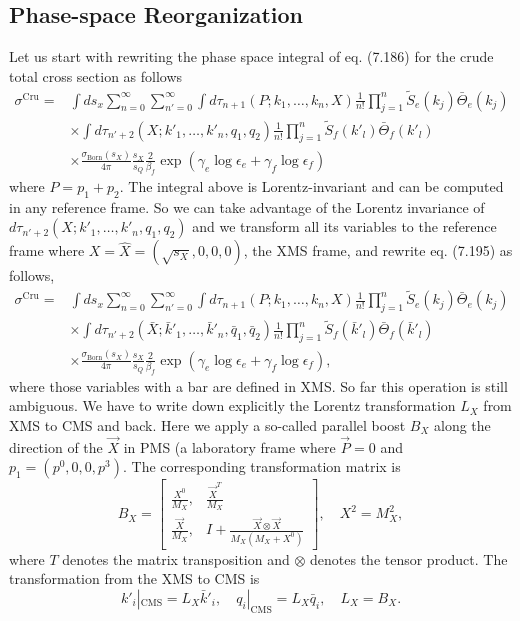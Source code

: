 \subsection{Phase-space Reorganization}
Let us start with rewriting the phase space integral of eq. (7.186) for the crude total cross section as follows 
\begin{align}
\sigma^\text{Cru}=&\int ds_x\sum_{n=0}^{\infty}\sum_{n'=0}^{\infty}\int d\tau_{n+1}(P;k_1,\ldots,k_n,X)
 \frac{1}{n!}\prod_{j=1}^{n}\widetilde{S}_e(k_j)\bar{\Theta}_e(k_j)\nonumber\\
 &\times\int d\tau_{n'+2}(X;k'_1,\ldots,k'_n,q_1,q_2)\frac{1}{n!}\prod_{j=1}^{n}\widetilde{S}_f(k'_l)\bar{\Theta}_f(k'_l)\nonumber\\
 &\times\frac{\sigma_\text{Born}(s_X)}{4\pi}\frac{s_X}{s_Q}\frac{2}{\beta_f}\exp(\gamma_e\log\epsilon_e+\gamma_f\log\epsilon_f)
\end{align}
where $P=p_1+p_2$. The integral above is Lorentz-invariant and can be computed in any reference frame. So we can take advantage of the Lorentz invariance of $d\tau_{n'+2}(X;k'_1,\ldots,k'_n,q_1,q_2)$ and we transform all its variables to the reference frame where $X=\hat{X}=(\sqrt{s_X},0,0,0)$, the XMS frame, and rewrite eq. (7.195) as follows,
\begin{align}
\sigma^\text{Cru}=&\int ds_x\sum_{n=0}^{\infty}\sum_{n'=0}^{\infty}\int d\tau_{n+1}(P;k_1,\ldots,k_n,X)
\frac{1}{n!}\prod_{j=1}^{n}\widetilde{S}_e(k_j)\bar{\Theta}_e(k_j)\nonumber\\
&\times\int d\tau_{n'+2}(\bar{X};\bar{k}'_1,\ldots,\bar{k}'_n,\bar{q}_1,\bar{q}_2)\frac{1}{n!}\prod_{j=1}^{n}\widetilde{S}_f(\bar{k}'_l)\bar{\Theta}_f(\bar{k}'_l)\nonumber\\
&\times\frac{\sigma_\text{Born}(s_X)}{4\pi}\frac{s_X}{s_Q}\frac{2}{\beta_f}\exp(\gamma_e\log\epsilon_e+\gamma_f\log\epsilon_f),
\end{align}
where those variables with a bar are defined in XMS. So far this operation is still ambiguous. We have to write down explicitly the Lorentz transformation $L_X$ from XMS to CMS and back. Here we apply a so-called parallel boost $B_X$ along the direction of the $\vec{X}$ in PMS (a laboratory frame where $\vec{P}=0$ and $p_1=(p^0,0,0,p^3)$. The corresponding transformation matrix is
\begin{equation}
B_X=\left[\begin{array}{cc}
\frac{X^0}{M_X},&\frac{\vec{X}^T}{M_X}\\
\frac{\vec{X}}{M_X},&I+\frac{\vec{X}\otimes\vec{X}}{M_X(M_X+X^0)}
\end{array}\right], \quad X^2=M_X^2,
\end{equation}
where $T$ denotes the matrix transposition and $\otimes$ denotes the tensor product. The transformation from the XMS to CMS is
\begin{equation}
k'_i|_\text{CMS}=L_X\bar{k}'_i,\quad q_i|_\text{CMS}=L_X\bar{q}_i,\quad L_X=B_X.
\end{equation}

